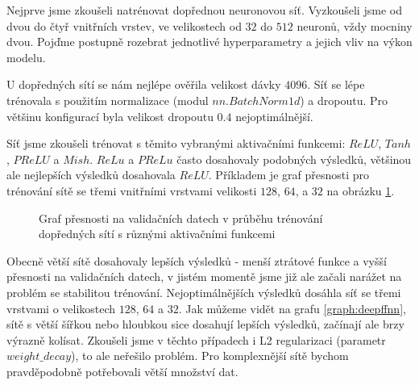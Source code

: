 Nejprve jsme zkoušeli natrénovat dopřednou neuronovou síť. Vyzkoušeli jsme od
dvou do čtyř vnitřních vrstev, ve velikostech od $32$ do $512$ neuronů, vždy
mocniny dvou. Pojďme postupně rozebrat jednotlivé hyperparametry a jejich vliv
na výkon modelu.

U dopředných sítí se nám nejlépe ověřila velikost dávky $4096$. Síť se lépe
trénovala s použitím normalizace (modul $nn.BatchNorm1d$) a dropoutu. Pro
většinu konfigurací byla velikost dropoutu $0.4$ nejoptimálnější.

Síť jsme zkoušeli trénovat s těmito vybranými aktivačními funkcemi: $ReLU$,
$Tanh$, $PReLU$ a $Mish$. $ReLu$ a $PReLu$ často dosahovaly podobných výsledků,
většinou ale nejlepších výsledků dosahovala $ReLU$. Příkladem je graf přesnosti
pro trénování sítě se třemi vnitřními vrstvami velikosti $128$, $64$, a $32$ na
obrázku \ref{graph:fnnactivations}.

\begin{figure}[]
    \centering
    \caption{Graf přesnosti na validačních datech v průběhu trénování dopředných sítí s různými aktivačními funkcemi}
    \label{graph:fnnactivations}
\end{figure}

Obecně větší sítě dosahovaly lepších výsledků - menší ztrátové funkce a vyšší
přesnosti na validačních datech, v jistém momentě jsme již ale začali narážet
na problém se stabilitou trénování. Nejoptimálnějších výsledků dosáhla síť se
třemi vrstvami o velikostech $128$, $64$ a $32$. Jak můžeme vidět na grafu
\ref{graph:deepffnn}, sítě s větší šířkou nebo hloubkou sice dosahují lepších
výsledků, začínají ale brzy výrazně kolísat. Zkoušeli jsme v těchto případech i
L2 regularizaci (parametr $weight\_decay$), to ale neřešilo problém. Pro
komplexnější sítě bychom pravděpodobně potřebovali větší množství dat.

